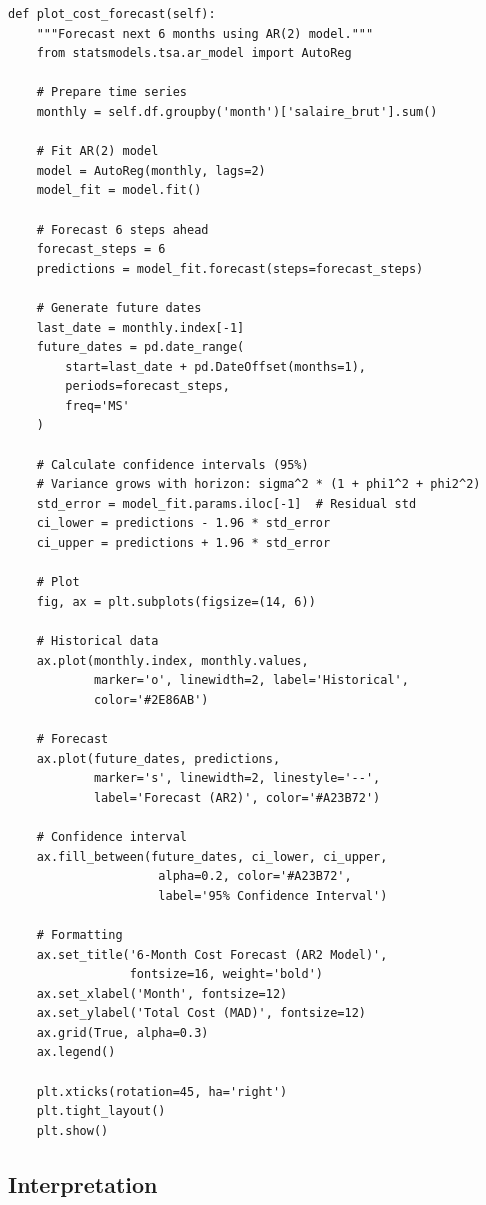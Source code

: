 \begin{lstlisting}[style=pythonstyle]
def plot_cost_forecast(self):
    """Forecast next 6 months using AR(2) model."""
    from statsmodels.tsa.ar_model import AutoReg
    
    # Prepare time series
    monthly = self.df.groupby('month')['salaire_brut'].sum()
    
    # Fit AR(2) model
    model = AutoReg(monthly, lags=2)
    model_fit = model.fit()
    
    # Forecast 6 steps ahead
    forecast_steps = 6
    predictions = model_fit.forecast(steps=forecast_steps)
    
    # Generate future dates
    last_date = monthly.index[-1]
    future_dates = pd.date_range(
        start=last_date + pd.DateOffset(months=1),
        periods=forecast_steps,
        freq='MS'
    )
    
    # Calculate confidence intervals (95%)
    # Variance grows with horizon: sigma^2 * (1 + phi1^2 + phi2^2)
    std_error = model_fit.params.iloc[-1]  # Residual std
    ci_lower = predictions - 1.96 * std_error
    ci_upper = predictions + 1.96 * std_error
    
    # Plot
    fig, ax = plt.subplots(figsize=(14, 6))
    
    # Historical data
    ax.plot(monthly.index, monthly.values,
            marker='o', linewidth=2, label='Historical',
            color='#2E86AB')
    
    # Forecast
    ax.plot(future_dates, predictions,
            marker='s', linewidth=2, linestyle='--',
            label='Forecast (AR2)', color='#A23B72')
    
    # Confidence interval
    ax.fill_between(future_dates, ci_lower, ci_upper,
                     alpha=0.2, color='#A23B72',
                     label='95% Confidence Interval')
    
    # Formatting
    ax.set_title('6-Month Cost Forecast (AR2 Model)',
                 fontsize=16, weight='bold')
    ax.set_xlabel('Month', fontsize=12)
    ax.set_ylabel('Total Cost (MAD)', fontsize=12)
    ax.grid(True, alpha=0.3)
    ax.legend()
    
    plt.xticks(rotation=45, ha='right')
    plt.tight_layout()
    plt.show()
\end{lstlisting}

\subsection{Interpretation}

